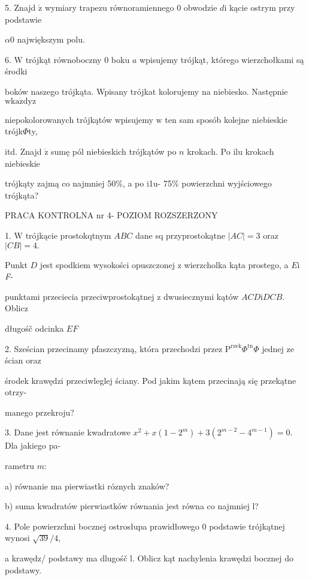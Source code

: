 \documentclass[a4paper,12pt]{article}
\begin{document}
5. Znajd $\acute{\mathrm{z}}$ wymiary trapezu równoramiennego $0$ obwodzie $d\mathrm{i}$ kącie ostrym przy podstawie

$\alpha 0$ największym polu.

6. $\mathrm{W}$ trójkąt równoboczny $0$ boku $a$ wpisujemy trójkąt, którego wierzchołkami są środki

boków naszego trójkąta. Wpisany trójkat kolorujemy na niebiesko. Następnie $\mathrm{w}\mathrm{k}\mathrm{a}\dot{\mathrm{z}}\mathrm{d}\mathrm{y}\mathrm{z}$

niepokolorowanych trójkątów wpisujemy $\mathrm{w}$ ten sam sposób kolejne niebieskie trójk$\Phi$ty,

itd. Znajd $\acute{\mathrm{z}}$ sumę pól niebieskich trójkątów po $n$ krokach. Po ilu krokach niebieskie

trójkąty zajmą co najmniej 50\%, a po i1u- 75\% powierzchni wyjściowego trójkąta?





PRACA KONTROLNA nr 4- POZIOM ROZSZERZONY

1. $\mathrm{W}$ trójkącie prostokqtnym $ABC$ dane sq przyprostokątne $|AC| = 3$ oraz $|CB| = 4.$

Punkt $D$ jest spodkiem wysokości opuszczonej $\mathrm{z}$ wierzcholka kąta prostego, a $E\mathrm{i}$ {\it F}-

punktami przeciecia przeciwprostokątnej $\mathrm{z}$ dwusiecznymi kątów $ACD \mathrm{i} DCB$. Oblicz

długośč odcinka $EF$

2. Sześcian przecinamy pfaszczyzną, która przechodzi przez $\mathrm{P}^{\mathrm{r}\mathrm{z}\mathrm{e}\mathrm{k}}\Phi^{\mathrm{t}\mathrm{n}}\Phi$ jednej ze ścian oraz

środek krawędzi przeciwleglej ściany. Pod jakim kątem przecinają się przekątne otrzy-

manego przekroju?

3. Dane jest równanie kwadratowe $x^{2}+x(1-2^{m})+3(2^{m-2}-4^{m-1})=0$. Dla jakiego pa-

rametru $m$:

a) równanie ma pierwiastki róznych znaków?

b) suma kwadratów pierwiastków równania jest równa co najmniej l?

4. Pole powierzchni bocznej ostrosłupa prawidłowego $0$ podstawie trójkątnej wynosi $\sqrt{39}/4,$

a krawędz/ podstawy ma dlugośč l. Oblicz kąt nachylenia krawędzi bocznej do podstawy.
\end{document}
